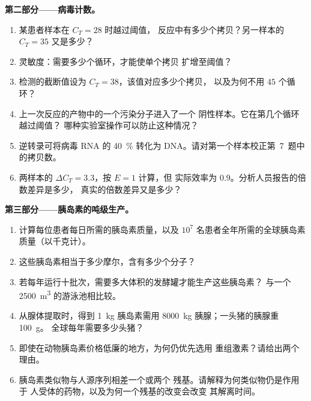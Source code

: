 \begin{problem}
\medskip
\noindent\textbf{第二部分——病毒计数。}
\begin{enumerate}[resume]
  \item 某患者样本在 $C_{T} = 28$ 时越过阈值，
        反应中有多少个拷贝？另一样本的 $C_{T} = 35$ 又是多少？
  \item 灵敏度：需要多少个循环，才能使单个拷贝
        扩增至阈值？
  \item 检测的截断值设为 $C_{T} = 38$，该值对应多少个拷贝，
        以及为何不用 $45$ 个循环？
  \item 上一次反应的产物中的一个污染分子进入了一个
        阴性样本。它在第几个循环越过阈值？
        哪种实验室操作可以防止这种情况？
  \item 逆转录可将病毒 RNA 的 \qty{40}{\%} 转化为
        DNA。请对第一个样本校正第~7~题中的拷贝数。
  \item 两样本的 $\Delta C_{T} = 3.3$，按 $E = 1$ 计算，但
        实际效率为 $0.9$。分析人员报告的倍数差异是多少，
        真实的倍数差异又是多少？
\end{enumerate}

\medskip
\noindent\textbf{第三部分——胰岛素的吨级生产。}
\begin{enumerate}[resume]
  \item 计算每位患者每日所需的胰岛素质量，以及
        $10^{7}$ 名患者全年所需的全球胰岛素质量（以千克计）。
  \item 这些胰岛素相当于多少摩尔，含有多少个分子？
  \item 若每年运行十批次，需要多大体积的发酵罐才能生产这些胰岛素？
        与一个 \qty{2500}{m^3} 的游泳池相比较。
  \item 从腺体提取时，得到 \qty{1}{kg} 胰岛素需用
        \qty{8000}{kg} 胰腺；一头猪的胰腺重 \qty{100}{g}。
        全球每年需要多少头猪？
  \item 即使在动物胰岛素价格低廉的地方，为何仍优先选用
        重组激素？请给出两个理由。
  \item 胰岛素类似物与人源序列相差一个或两个
        残基。请解释为何类似物仍是作用于
        人受体的药物，以及为何一个残基的改变会改变
        其解离时间。
\end{enumerate}


\end{problem}
